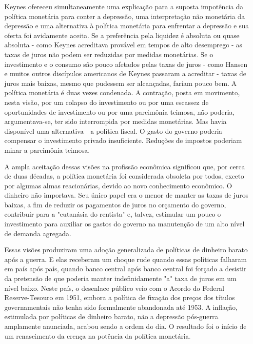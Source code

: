 \documentclass[12pt]{article}
\begin{document}
Keynes ofereceu simultaneamente uma explicação para a suposta impotência da política monetária para conter a depressão, uma interpretação não monetária da depressão e uma alternativa à política monetária para enfrentar a depressão e sua oferta foi avidamente aceita. Se a preferência pela liquidez é absoluta ou quase absoluta - como Keynes acreditava provável em tempos de alto desemprego - as taxas de juros não podem ser reduzidas por medidas monetárias. Se o investimento e o consumo são pouco afetados pelas taxas de juros - como Hansen e muitos outros discípulos americanos de Keynes passaram a acreditar - taxas de juros mais baixas, mesmo que pudessem ser alcançadas, fariam pouco bem. A política monetária é duas vezes condenada. A contração, posta em movimento, nesta visão, por um colapso do investimento ou por uma escassez de oportunidades de investimento ou por uma parcimônia teimosa, não poderia, argumentava-se, ter sido interrompida por medidas monetárias. Mas havia disponível uma alternativa - a política fiscal. O gasto do governo poderia compensar o investimento privado insuficiente. Reduções de impostos poderiam minar a parcimônia teimosa.

A ampla aceitação dessas visões na profissão econômica significou que, por cerca de duas décadas, a política monetária foi considerada obsoleta por todos, exceto por algumas almas reacionárias, devido ao novo conhecimento econômico. O dinheiro não importava. Seu único papel era o menor de manter as taxas de juros baixas, a fim de reduzir os pagamentos de juros no orçamento do governo, contribuir para a "eutanásia do rentista" e, talvez, estimular um pouco o investimento para auxiliar os gastos do governo na manutenção de um alto nível de demanda agregada.

Essas visões produziram uma adoção generalizada de políticas de dinheiro barato após a guerra. E elas receberam um choque rude quando essas políticas falharam em país após país, quando banco central após banco central foi forçado a desistir da pretensão de que poderia manter indefinidamente "a" taxa de juros em um nível baixo. Neste país, o desenlace público veio com o Acordo do Federal Reserve-Tesouro em 1951, embora a política de fixação dos preços dos títulos governamentais não tenha sido formalmente abandonada até 1953. A inflação, estimulada por políticas de dinheiro barato, não a depressão pós-guerra amplamente anunciada, acabou sendo a ordem do dia. O resultado foi o início de um renascimento da crença na potência da política monetária.
\end{document}
